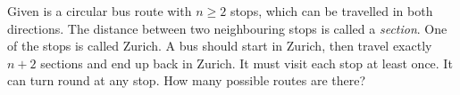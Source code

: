 Given is a circular bus route with $n\geq 2$ stops, which can be travelled in both directions.
The distance between two neighbouring stops is called a \emph{section}. One of the stops is called Zurich.
A bus should start in Zurich, then travel exactly $n+2$ sections and end up back in Zurich.
It must visit each stop at least once. It can turn round at any stop.
How many possible routes are there?
